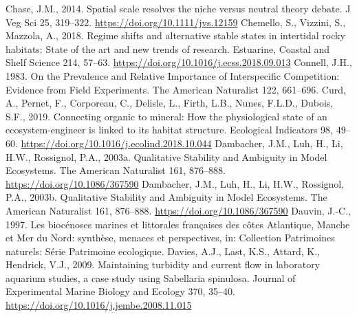 \documentclass[12pt]{report}
\begin{document}
\begin{singlespacing}
\newline\newline
Chase, J.M., 2014. Spatial scale resolves the niche versus neutral theory debate. J Veg Sci 25, 319–322. \href{https://doi.org/10.1111/jvs.12159}{https://doi.org/10.1111/jvs.12159}
\newline\newline
Chemello, S., Vizzini, S., Mazzola, A., 2018. Regime shifts and alternative stable states in intertidal rocky habitats: State of the art and new trends of research. Estuarine, Coastal and Shelf Science 214, 57–63. \href{https://doi.org/10.1016/j.ecss.2018.09.013}{https://doi.org/10.1016/j.ecss.2018.09.013}
\newline\newline
Connell, J.H., 1983. On the Prevalence and Relative Importance of Interspecific Competition: Evidence from Field Experiments. The American Naturalist 122, 661–696.
\newline\newline
Curd, A., Pernet, F., Corporeau, C., Delisle, L., Firth, L.B., Nunes, F.L.D., Dubois, S.F., 2019. Connecting organic to mineral: How the physiological state of an ecosystem-engineer is linked to its habitat structure. Ecological Indicators 98, 49–60. \href{https://doi.org/10.1016/j.ecolind.2018.10.044}{https://doi.org/10.1016/j.ecolind.2018.10.044}
\newline\newline
Dambacher, J.M., Luh, H., Li, H.W., Rossignol, P.A., 2003a. Qualitative Stability and Ambiguity in Model Ecosystems. The American Naturalist 161, 876–888. \href{https://doi.org/10.1086/367590}{https://doi.org/10.1086/367590}
\newline\newline
Dambacher, J.M., Luh, H., Li, H.W., Rossignol, P.A., 2003b. Qualitative Stability and Ambiguity in Model Ecosystems. The American Naturalist 161, 876–888. \href{https://doi.org/10.1086/367590}{https://doi.org/10.1086/367590}
\newline\newline
Dauvin, J.-C., 1997. Les biocénoses marines et littorales françaises des côtes Atlantique, Manche et Mer du Nord: synthèse, menaces et perspectives, in: Collection Patrimoines naturels: Série Patrimoine ecologique.
\newline\newline
Davies, A.J., Last, K.S., Attard, K., Hendrick, V.J., 2009. Maintaining turbidity and current flow in laboratory aquarium studies, a case study using Sabellaria spinulosa. Journal of Experimental Marine Biology and Ecology 370, 35–40. \href{https://doi.org/10.1016/j.jembe.2008.11.015}{https://doi.org/10.1016/j.jembe.2008.11.015}

\end{singlespacing}
\end{document}
